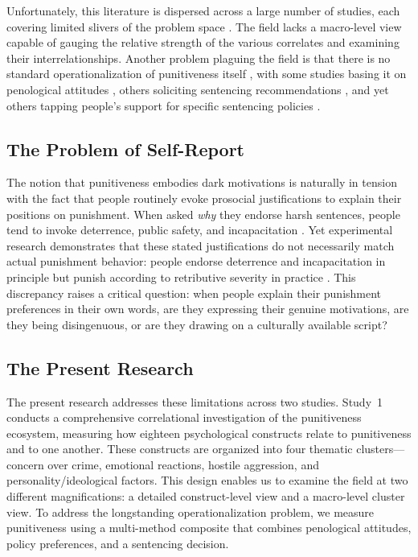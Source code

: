 Unfortunately, this literature is dispersed across a large number of studies, each covering limited slivers of the problem space \citep[for partial exceptions, see][]{KingMaruna2009, GerberJackson2013, Okimoto2012}. The field lacks a macro-level view capable of gauging the relative strength of the various correlates and examining their interrelationships. Another problem plaguing the field is that there is no standard operationalization of punitiveness itself \citep[see][]{Adriaenssen2015, Gerber2021}, with some studies basing it on penological attitudes \citep[e.g.,][]{Cullen1985}, others soliciting sentencing recommendations \citep[e.g.,][]{Carlsmith2008}, and yet others tapping people's support for specific sentencing policies \citep[e.g.,][]{TylerBoeckmann1997}.

\subsection{The Problem of Self-Report}

The notion that punitiveness embodies dark motivations is naturally in tension with the fact that people routinely evoke prosocial justifications to explain their positions on punishment. When asked \textit{why} they endorse harsh sentences, people tend to invoke deterrence, public safety, and incapacitation \citep{Carlsmith2008, Roberts2003}. Yet experimental research demonstrates that these stated justifications do not necessarily match actual punishment behavior: people endorse deterrence and incapacitation in principle but punish according to retributive severity in practice \citep{Carlsmith2006, CarlsmithDarley2008, AharoniFridlund2012, Twardawski2022}. This discrepancy raises a critical question: when people explain their punishment preferences in their own words, are they expressing their genuine motivations, are they being disingenuous, or are they drawing on a culturally available script?

\subsection{The Present Research}

The present research addresses these limitations across two studies. Study~1 conducts a comprehensive correlational investigation of the punitiveness ecosystem, measuring how eighteen psychological constructs relate to punitiveness and to one another. These constructs are organized into four thematic clusters---concern over crime, emotional reactions, hostile aggression, and personality/ideological factors. This design enables us to examine the field at two different magnifications: a detailed construct-level view and a macro-level cluster view. To address the longstanding operationalization problem, we measure punitiveness using a multi-method composite that combines penological attitudes, policy preferences, and a sentencing decision.

